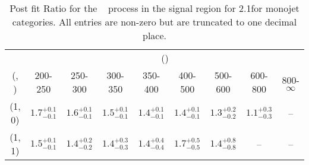 \begin{table}[h!]
\tiny
\centering
\caption{Post fit Ratio for the \zInv~ process in the signal region for 2.1\ifb for monojet categories. All entries are non-zero but are truncated to one decimal place.\label{tab:ratioseppost_sig_zinv_mono}}
\begin{tabular}
{ccccccccc}
	\hline\hline
	& \multicolumn{8}{c}{\scalht (\gev)} \\ 
	 (\njet,  \nb) & 200-250 & 250-300 & 300-350 & 350-400 & 400-500 & 500-600 & 600-800 & 800-$\infty$ \\ [0.8ex] 
\hline
	(1, 0) & $1.7^{+ 0.1 }_{- 0.1 }$ & $1.6^{+ 0.1 }_{- 0.1 }$ & $1.5^{+ 0.1 }_{- 0.1 }$ & $1.4^{+ 0.1 }_{- 0.1 }$ & $1.4^{+ 0.1 }_{- 0.1 }$ & $1.3^{+ 0.2 }_{- 0.2 }$ & $1.1^{+ 0.3 }_{- 0.3 }$ & -- \\[0.5ex] 
	(1, 1) & $1.5^{+ 0.1 }_{- 0.1 }$ & $1.4^{+ 0.2 }_{- 0.2 }$ & $1.4^{+ 0.3 }_{- 0.3 }$ & $1.4^{+ 0.4 }_{- 0.4 }$ & $1.7^{+ 0.5 }_{- 0.5 }$ & $1.4^{+ 0.8 }_{- 0.8 }$ & -- & -- \\[0.5ex] 
	\hline
	\hline
\end{tabular}
\end{table}
